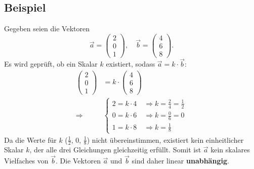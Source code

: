 \subsection*{Beispiel}
Gegeben seien die Vektoren
\[
    \vec{a} = \begin{pmatrix} 2 \\ 0 \\ 1 \end{pmatrix}, \quad \vec{b} = \begin{pmatrix} 4 \\ 6 \\ 8 \end{pmatrix}.
\]
Es wird geprüft, ob ein Skalar $k$ existiert, sodass $\vec{a} = k \cdot
    \vec{b}$:
\begin{align*}
    \begin{pmatrix} 2 \\ 0 \\ 1 \end{pmatrix} & = k \cdot \begin{pmatrix} 4 \\ 6 \\ 8 \end{pmatrix}           \\
    \Rightarrow \quad                         & \begin{cases}
                                                    2 = k \cdot 4 \quad \Rightarrow k = \frac{2}{4} = \frac{1}{2} \\
                                                    0 = k \cdot 6 \quad \Rightarrow k = \frac{0}{6} = 0           \\
                                                    1 = k \cdot 8 \quad \Rightarrow k = \frac{1}{8}
                                                \end{cases}
\end{align*}
Da die Werte für $k$ ($\frac{1}{2}$, $0$, $\frac{1}{8}$) nicht übereinstimmen, existiert kein einheitlicher Skalar $k$, der alle drei Gleichungen gleichzeitig erfüllt. Somit ist $\vec{a}$ kein skalares Vielfaches von $\vec{b}$. Die Vektoren $\vec{a}$ und $\vec{b}$ sind daher linear \textbf{unabhängig}.

